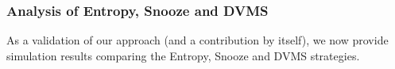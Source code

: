 \subsubsection{Analysis of Entropy, Snooze and DVMS}
\label{subsec:first-usecase}

As a validation of our approach (and a contribution by itself), we now
provide simulation results comparing the Entropy, Snooze and DVMS
strategies.


